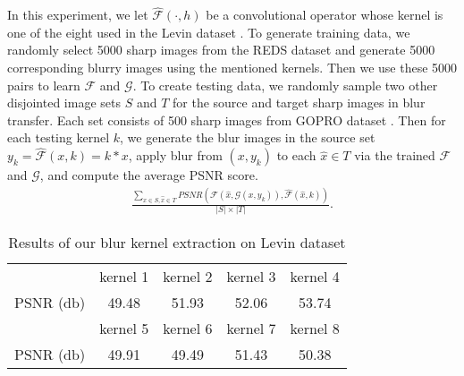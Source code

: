 \documentclass[final]{cvpr}
\newcommand{\anh}[1]{{\textcolor{cyan}{[Anh: #1]}}}
\begin{document}
In this experiment, we let $\hat{\mathcal{F}}(\cdot, h)$ be a convolutional operator whose kernel is one of the eight used in the Levin dataset \cite{levin2009understanding}. To generate training data, we randomly select 5000 sharp images from the REDS dataset \cite{nah2019ntire} and generate 5000 corresponding blurry images using the mentioned kernels. Then we use these 5000 pairs to learn $\mathcal{F}$ and $\mathcal{G}$. To create testing data, we randomly sample two other disjointed image sets $S$ and $T$ for the source and target sharp images in blur transfer. Each set consists of 500 sharp images from GOPRO dataset \cite{nah2017deep}. Then for each testing kernel $k$, we generate the blur images in the source set $y_k = \hat{\mathcal{F}}(x, k) = k * x$, apply blur from $(x, y_k)$ to each $\hat{x} \in T$ via the trained $\mathcal{F}$ and $\mathcal{G}$, and compute the average PSNR score.
    \begin{align}
        \frac{\sum_{x \in S, \hat{x} \in T} PSNR (\mathcal{F}(\hat{x}, \mathcal{G}(x, y_k)), \hat{\mathcal{F}}(\hat{x}, k))}{|S|\times|T|}.
    \end{align}



\begin{table}[hb]
    \centering
    \vspace{-2mm}
    \begin{tabular}{ccccc}
        \toprule
         & kernel 1 & kernel 2 & kernel 3 & kernel 4\\
         \cmidrule(lr){2-5}
         PSNR (db) & 49.48 & 51.93 & 52.06 & 53.74\\
         \bottomrule
         & kernel 5 & kernel 6 & kernel 7 & kernel 8 \\
         \cmidrule(lr){2-5}
         PSNR (db) & 49.91 & 49.49 & 51.43 & 50.38\\
         \bottomrule
    \end{tabular}
    \vskip 0.05in
    \caption{Results of our blur kernel extraction on Levin dataset}
    \label{tab:levinexp}
\end{table}
\end{document}
